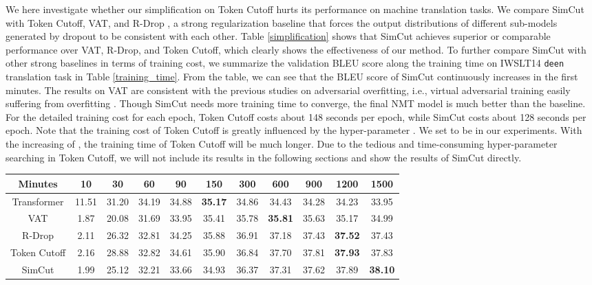 \documentclass[11pt]{article}
\begin{document}
We here investigate whether our simplification on Token Cutoff hurts its performance on machine translation tasks. We compare SimCut with Token Cutoff, VAT, and R-Drop \cite{liang2021r}, a strong regularization baseline that forces the output distributions of different sub-models generated by dropout to be consistent with each other. Table \ref{simplification} shows that SimCut achieves superior or comparable performance over VAT, R-Drop, and Token Cutoff, which clearly shows the effectiveness of our method. To further compare SimCut with other strong baselines in terms of training cost, we summarize the validation BLEU score along the training time on IWSLT14 \texttt{de}\texttt{en} translation task in Table \ref{training_time}. From the table, we can see that the BLEU score of SimCut continuously increases in the first  minutes. The results on VAT are consistent with the previous studies on adversarial overfitting, i.e., virtual adversarial training easily suffering from overfitting \cite{rice2020overfitting}. Though SimCut needs more training time to converge, the final NMT model is much better than the baseline. For the detailed training cost for each epoch, Token Cutoff costs about 148 seconds per epoch, while SimCut costs about 128 seconds per epoch. Note that the training cost of Token Cutoff is greatly influenced by the hyper-parameter . We set  to be  in our experiments. With the increasing of , the training time of Token Cutoff will be much longer. Due to the tedious and time-consuming hyper-parameter searching in Token Cutoff, we will not include its results in the following sections and show the results of SimCut directly.



\begin{table*}
\centering
\begin{tabular}{c|c|c|c|c|c|c|c|c|c|c}
\hline
Minutes & 10 & 30 & 60 & 90 & 150 & 300 & 600 & 900 & 1200 & 1500 \\
\hline\hline
Transformer & 11.51 & 31.20 & 34.19 & 34.88 & \bf 35.17 & 34.86 & 34.43 & 34.28 & 34.23 & 33.95 \\
VAT & 1.87 & 20.08 & 31.69 & 33.95 & 35.41 & 35.78 & \bf 35.81 & 35.63 & 35.17 & 34.99 \\
R-Drop & 2.11 & 26.32 & 32.81 & 34.25 & 35.88 & 36.91 & 37.18 & 37.43 & \bf 37.52 & 37.43 \\
Token Cutoff & 2.16 & 28.88 & 32.82 & 34.61 & 35.90 & 36.84 & 37.70 & 37.81 & \bf 37.93 & 37.83 \\
\hline
SimCut & 1.99 & 25.12 & 32.21 & 33.66 & 34.93 & 36.37 & 37.31 & 37.62 & 37.89 & \bf 38.10 \\
\end{tabular}
\caption{On the IWSLT14 \texttt{de}\texttt{en} validation set, the BLEU score increases over time in model training using SimCut. In contrast, the BLEU scores of the other strong baselines all stop increasing before  minutes. The results suggest that the use of SimCut can effectively alleviate the model training from overfitting. \label{training_time}}
\end{table*}
\end{document}
